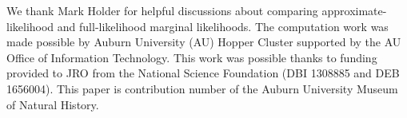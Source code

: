 We thank Mark Holder for helpful discussions about comparing
approximate-likelihood and full-likelihood marginal likelihoods.
The computation work was made possible by Auburn University (AU) Hopper Cluster
supported by the AU Office of Information Technology.
This work was possible thanks to funding provided to JRO from the National
Science Foundation (DBI 1308885 and DEB 1656004).
This paper is contribution number  of the Auburn University
Museum of Natural History.

